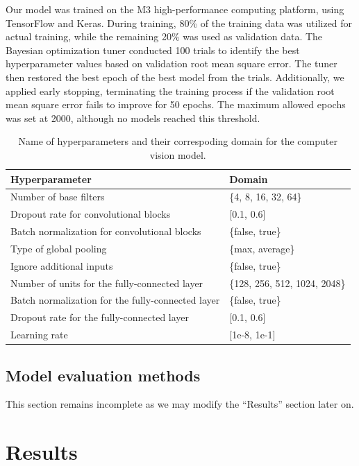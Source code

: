 \documentclass[]{interact}
\theoremstyle{plain}%
\theoremstyle{definition}
\theoremstyle{remark}
\begin{document}
Our model was trained on the M3 high-performance computing platform,
using TensorFlow and Keras. During training, 80\% of the training data
was utilized for actual training, while the remaining 20\% was used as
validation data. The Bayesian optimization tuner conducted 100 trials to
identify the best hyperparameter values based on validation root mean
square error. The tuner then restored the best epoch of the best model
from the trials. Additionally, we applied early stopping, terminating
the training process if the validation root mean square error fails to
improve for 50 epochs. The maximum allowed epochs was set at 2000,
although no models reached this threshold.

\begin{table}

\caption{\label{tab:hyperparameter}Name of hyperparameters and their correspoding domain for the computer vision model.}
\centering
\begin{tabular}[t]{ll}
\toprule
Hyperparameter & Domain\\
\midrule
Number of base filters & \{4, 8, 16, 32, 64\}\\
Dropout rate for convolutional blocks & {}[0.1, 0.6]\\
Batch normalization for convolutional blocks & \{false, true\}\\
Type of global pooling & \{max, average\}\\
Ignore additional inputs & \{false, true\}\\
\addlinespace
Number of units for the fully-connected layer & \{128, 256, 512, 1024, 2048\}\\
Batch normalization for the fully-connected layer & \{false, true\}\\
Dropout rate for the fully-connected layer & {}[0.1, 0.6]\\
Learning rate & {}[1e-8, 1e-1]\\
\bottomrule
\end{tabular}
\end{table}

\hypertarget{model-evaluation-methods}{%
\subsection{Model evaluation methods}\label{model-evaluation-methods}}

This section remains incomplete as we may modify the ``Results'' section
later on.

\hypertarget{results}{%
\section{Results}\label{results}}
\end{document}
